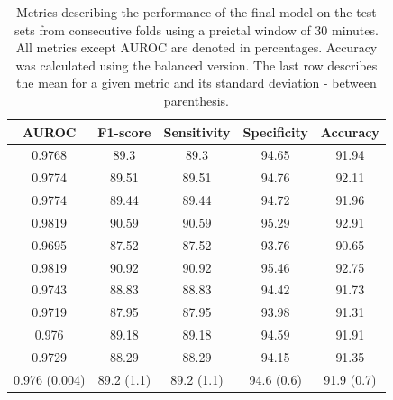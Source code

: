 \documentclass[a4paper,fleqn]{cas-sc}
\begin{document}
\begin{table}[h]
    \centering
    \begin{tabular}{c|c|c|c|c}    
        AUROC & F1-score & Sensitivity & Specificity & Accuracy \\
        \hline
        \hline
        0.9768 & 89.3 & 89.3 & 94.65 & 91.94 \\
        0.9774 & 89.51 & 89.51 & 94.76 & 92.11 \\
        0.9774 & 89.44 & 89.44 & 94.72 & 91.96 \\
        0.9819 & 90.59 & 90.59 & 95.29 & 92.91 \\
        0.9695 & 87.52 & 87.52 & 93.76 & 90.65 \\
        0.9819 & 90.92 & 90.92 & 95.46 & 92.75 \\
        0.9743 & 88.83 & 88.83 & 94.42 & 91.73 \\
        0.9719 & 87.95 & 87.95 & 93.98 & 91.31 \\
        0.976 & 89.18 & 89.18 & 94.59 & 91.91 \\
        0.9729 & 88.29 & 88.29 & 94.15 & 91.35 \\
        \hline
        0.976 (0.004) & 89.2 (1.1) & 89.2 (1.1) & 94.6 (0.6) & 91.9 (0.7) \\
        \hline
    \end{tabular}
\caption{Metrics describing the performance of the final model on the test sets from consecutive folds using a preictal window of 30 minutes. All metrics except AUROC are denoted in percentages. Accuracy was calculated using the balanced version. The last row describes the mean for a given metric and its standard deviation - between parenthesis.}
\label{tab:numbers_1800}
\end{table}
\end{document}
